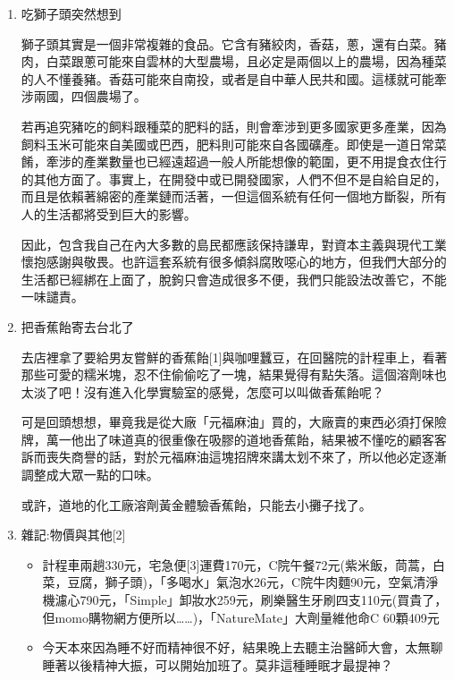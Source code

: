 \documentclass[
]{article}
\providecommand{\tightlist}{%
  \setlength{\itemsep}{0pt}\setlength{\parskip}{0pt}}
\begin{document}
\begin{enumerate}
\def\labelenumi{\arabic{enumi}.}
\item
  吃獅子頭突然想到

  獅子頭其實是一個非常複雜的食品。它含有豬絞肉，香菇，蔥，還有白菜。豬肉，白菜跟蔥可能來自雲林的大型農場，且必定是兩個以上的農場，因為種菜的人不懂養豬。香菇可能來自南投，或者是自中華人民共和國。這樣就可能牽涉兩國，四個農場了。

  若再追究豬吃的飼料跟種菜的肥料的話，則會牽涉到更多國家更多產業，因為飼料玉米可能來自美國或巴西，肥料則可能來自各國礦產。即使是一道日常菜餚，牽涉的產業數量也已經遠超過一般人所能想像的範圍，更不用提食衣住行的其他方面了。事實上，在開發中或已開發國家，人們不但不是自給自足的，而且是依賴著綿密的產業鏈而活著，一但這個系統有任何一個地方斷裂，所有人的生活都將受到巨大的影響。

  因此，包含我自己在內大多數的島民都應該保持謙卑，對資本主義與現代工業懷抱感謝與敬畏。也許這套系統有很多傾斜腐敗噁心的地方，但我們大部分的生活都已經綁在上面了，脫鉤只會造成很多不便，我們只能設法改善它，不能一味譴責。
\item
  把香蕉飴寄去台北了

  去店裡拿了要給男友嘗鮮的香蕉飴{[}1{]}與咖哩蠶豆，在回醫院的計程車上，看著那些可愛的糯米塊，忍不住偷偷吃了一塊，結果覺得有點失落。這個溶劑味也太淡了吧！沒有進入化學實驗室的感覺，怎麼可以叫做香蕉飴呢？

  可是回頭想想，畢竟我是從大廠「元福麻油」買的，大廠賣的東西必須打保險牌，萬一他出了味道真的很重像在吸膠的道地香蕉飴，結果被不懂吃的顧客客訴而喪失商譽的話，對於元福麻油這塊招牌來講太划不來了，所以他必定逐漸調整成大眾一點的口味。

  或許，道地的化工廠溶劑黃金體驗香蕉飴，只能去小攤子找了。
\item
  雜記:物價與其他{[}2{]}

  \begin{itemize}
  \tightlist
  \item
    計程車兩趟330元，宅急便{[}3{]}運費170元，C院午餐72元(紫米飯，茼蒿，白菜，豆腐，獅子頭)，「多喝水」氣泡水26元，C院牛肉麵90元，空氣清淨機濾心790元，「Simple」卸妝水259元，刷樂醫生牙刷四支110元(買貴了，但momo購物網方便所以\ldots\ldots)，「NatureMate」大劑量維他命C
    60顆409元
  \item
    今天本來因為睡不好而精神很不好，結果晚上去聽主治醫師大會，太無聊睡著以後精神大振，可以開始加班了。莫非這種睡眠才最提神？
  \end{itemize}
\end{enumerate}
\end{document}
